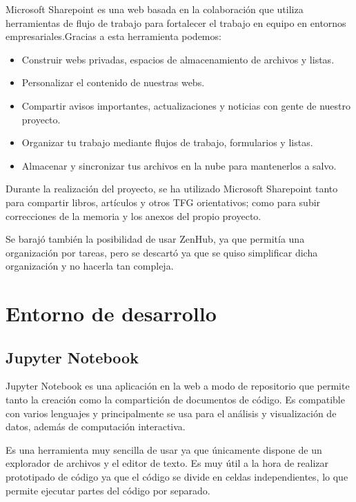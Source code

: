 Microsoft Sharepoint\cite{Sharepoint} es una web basada en la colaboración que utiliza herramientas de flujo de trabajo para fortalecer el trabajo en equipo en entornos empresariales.Gracias a esta herramienta podemos:

\begin{itemize}
    \item Construir webs privadas, espacios de almacenamiento de archivos y listas.
    \item Personalizar el contenido de nuestras webs.
    \item Compartir avisos importantes, actualizaciones y noticias con gente de nuestro proyecto.
    \item Organizar tu trabajo mediante flujos de trabajo, formularios y listas.
    \item Almacenar y sincronizar tus archivos en la nube para mantenerlos a salvo.
\end{itemize}

Durante la realización del proyecto, se ha utilizado Microsoft Sharepoint tanto para compartir libros, artículos y otros TFG orientativos; como para subir correcciones de la memoria y los anexos del propio proyecto.

Se barajó también la posibilidad de usar ZenHub, ya que permitía una organización por tareas, pero se descartó ya que se quiso simplificar dicha organización y no hacerla tan compleja.


\section{Entorno de desarrollo}

\subsection{Jupyter Notebook}

Jupyter Notebook\cite{Jupyter} es una aplicación en la web a modo de repositorio que permite tanto la creación como la compartición de documentos de código. Es compatible con varios lenguajes y principalmente se usa para el análisis y visualización de datos, además de computación interactiva.

Es una herramienta muy sencilla de usar ya que únicamente dispone de un explorador de archivos y el editor de texto.
Es muy útil a la hora de realizar prototipado de código ya que el código se divide en celdas independientes, lo que permite ejecutar partes del código por separado.

